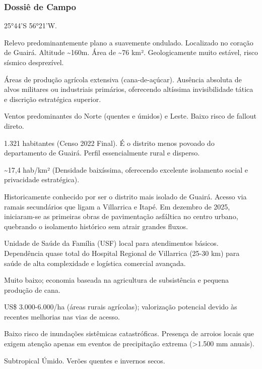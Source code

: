 \subsubsection{Dossiê de Campo}
\begin{description}[style=nextline,leftmargin=0.5cm,font=\bfseries]
\item[Coordenadas]  25°44'S 56°21'W.
\item[Topografia]  Relevo predominantemente plano a suavemente ondulado. Localizado no coração de Guairá. Altitude \textasciitilde 160m. Área de \textasciitilde 76 km². Geologicamente muito estável, risco sísmico desprezível.
\item[Alvos Estratégicos]  Áreas de produção agrícola extensiva (cana-de-açúcar). Ausência absoluta de alvos militares ou industriais primários, oferecendo altíssima invisibilidade tática e discrição estratégica superior.
\item[Fallout]  Ventos predominantes do Norte (quentes e úmidos) e Leste. Baixo risco de fallout direto.
\item[População]  1.321 habitantes (Censo 2022 Final). É o distrito menos povoado do departamento de Guairá. Perfil essencialmente rural e disperso.
\item[Densidade]  \textasciitilde 17,4 hab/\allowbreak km² (Densidade baixíssima, oferecendo excelente isolamento social e privacidade estratégica).
\item[Vias de Acesso]  Historicamente conhecido por ser o distrito mais isolado de Guairá. Acesso via ramais secundários que ligam a Villarrica e Itapé. Em dezembro de 2025, iniciaram-se as primeiras obras de pavimentação asfáltica no centro urbano, quebrando o isolamento histórico sem atrair grandes fluxos.
\item[Serviços]  Unidade de Saúde da Família (USF) local para atendimentos básicos. Dependência quase total do Hospital Regional de Villarrica (25-30 km) para saúde de alta complexidade e logística comercial avançada.
\item[Custo de Vida]  Muito baixo; economia baseada na agricultura de subsistência e pequena produção de cana.
\item[Preço da Terra]  US\$ 3.000-6.000/\allowbreak ha (áreas rurais agrícolas); valorização potencial devido às recentes melhorias nas vias de acesso.
\item[Hidrologia]  Baixo risco de inundações sistêmicas catastróficas. Presença de arroios locais que exigem atenção apenas em eventos de precipitação extrema (>1.500 mm anuais).
\item[Clima]  Subtropical Úmido. Verões quentes e invernos secos.

\end{description}
